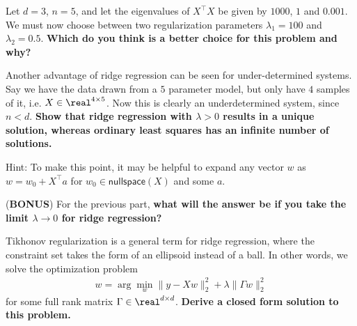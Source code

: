 \begin{Parts}
\Part Let $d = 3$, $n = 5$, and let the eigenvalues of $X^\top X$ be given by $1000$, $1$ and $0.001$. We must now choose between two regularization parameters $\lambda_1 = 100$ and $\lambda_2 = 0.5$. {\bf Which do you think is a better choice for this problem and why?}


\Part Another advantage of ridge regression can be seen for under-determined systems. Say we have the data drawn from a $5$ parameter model, but only have $4$ samples of it, i.e. $X \in \real^{4 \times 5}$. Now this is clearly an underdetermined system, since $n < d$. {\bf Show that ridge regression with $\lambda > 0$ results in a unique solution, whereas ordinary least squares has an infinite number of solutions.}

Hint: To make this point, it may be helpful to expand any vector $w$ as $w = w_0 + X^\top a$ for $w_0 \in \mathsf{nullspace}(X)$ and some $a$. 

\Part ({\bf BONUS}) For the previous part, {\bf what will the answer be if you take the limit $\lambda \rightarrow 0$ for ridge regression? }


\Part Tikhonov regularization is a general term for ridge regression, where the constraint set takes the form of an ellipsoid instead of a ball. In other words, we solve the optimization problem
\begin{align*}
w = \arg\min_{w} \| y - X w \|_2^2 + \lambda \| \Gamma w\|_2^2
\end{align*}
for some full rank matrix $\Gamma \in \real^{d \times d}$. {\bf Derive a closed form solution to this problem.}

\end{Parts}

